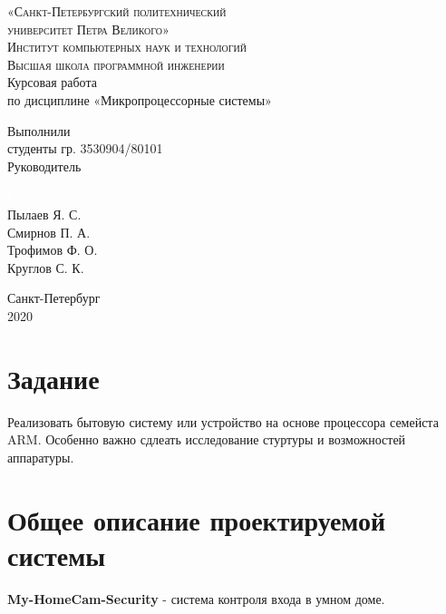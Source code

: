 \documentclass[a4paper,11pt]{article}
\begin{document}
\begin{titlepage}
  \center
  \textsc{\Large «Санкт-Петербургский политехнический \\ университет Петра Великого»}\\[0.5cm]
  \textsc{\large Институт компьютерных наук и технологий}\\
  \textsc{\large Высшая школа программной инженерии}\\[5.5cm]

  {
    \huge {Курсовая работа} \\[0.1cm]
    \Large {по дисциплине «Микропроцессорные системы»}
  } \\[4cm]

  \begin{multicols}{2}
  \begin{flushleft}
    {\Large Выполнили} \\[1.5mm] {\Large студенты гр. 3530904/80101}\\[2.0cm]
    {\Large Руководитель}
  \end{flushleft}
  \begin{flushright}
    \textcolor{white}{!}\\
    \Large {Пылаев Я. С.}\\
    \Large {Смирнов П. А.}\\
    \Large {Трофимов Ф. О.}\\[0.5cm]
    {\Large Круглов С. К.}
  \end{flushright}
  \end{multicols}

  \vspace{5cm}
  \centering
  \Large {
    Санкт-Петербург\\
    2020
  }
  \vfill
\end{titlepage}
\newpage

\def\contentsname{Содержание}
\begin{center}
  \tableofcontents
\end{center}
\newpage

\section{Задание}
\noindent Реализовать бытовую систему или устройство на основе процессора семейста ARM. Особенно важно сдлеать исследование стуртуры и возможностей аппаратуры. 
\section{Общее описание проектируемой системы}
\noindent \textbf{My-HomeCam-Security} - система контроля входа в умном доме.
\end{document}
